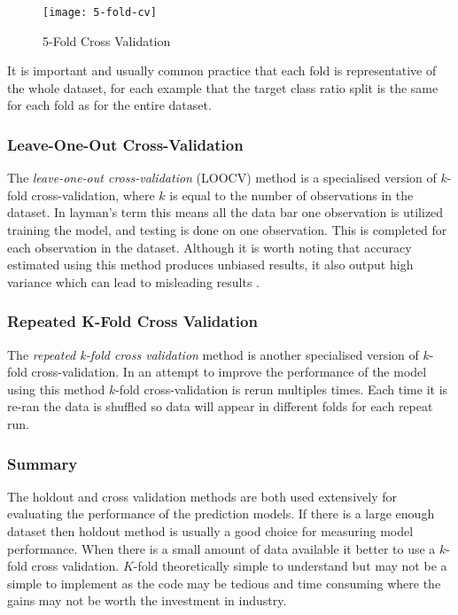 \begin{figure}[H]
	\texttt{[image: 5-fold-cv]}
	\caption{5-Fold Cross Validation}
	\label{fig:5-fold-cv}
\end{figure}

It is important and usually common practice that each fold is representative of the whole dataset, for each example that the target class ratio split is the same for each fold as for the entire dataset. 

\subsubsection{Leave-One-Out Cross-Validation}
The \textit{leave-one-out cross-validation} (LOOCV) method is a specialised version of $k$-fold cross-validation, where $k$ is equal to the number of observations in the dataset. In layman's term this means all the data bar one observation is utilized training the model, and testing is done on one observation. This is completed for each observation in the dataset. Although it is worth noting that accuracy estimated using this method produces unbiased results, it also output high variance which can lead to misleading results \citep{refaeilzadeh_cross-validation_2009}.
 

\subsubsection{Repeated K-Fold Cross Validation}
The \textit{repeated k-fold cross validation} method is another specialised version of $k$-fold cross-validation. In an attempt to improve the performance of the model using this method $k$-fold cross-validation is rerun multiples times. Each time it is re-ran the data is shuffled so data will appear in different folds for each repeat run. 

\subsubsection{Summary}

The holdout and cross validation methods are both used extensively for evaluating the performance of the prediction models. If there is a large enough dataset then holdout method is usually a good choice for measuring model performance. When there is a small amount of data available it better to use a $k$-fold cross validation. $K$-fold theoretically simple to understand but may not be a simple to implement as the code may be tedious and time consuming where the gains may not be worth the investment in industry. 

